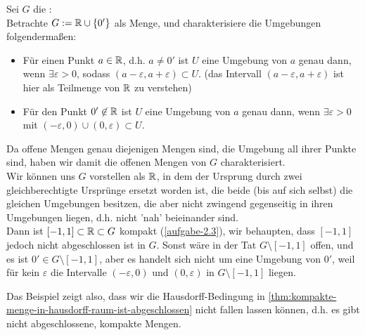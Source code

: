 \begin{example}
    Sei $G$ die : \\
    Betrachte $G:=\mathbb{R} \cup  \left \{0'\right\} $ als Menge, und charakterisiere die Umgebungen folgendermaßen:
    \begin{itemize}
        \item Für einen Punkt $a\in \mathbb{R}$, d.h. $a\neq 0'$ ist $U$ eine Umgebung von  $a$ genau dann, wenn  $\exists ε>0$, sodass $(a-ε,a+ε)\subset U$. (das Intervall $(a-ε,a+ε)$ ist hier als Teilmenge von  $\mathbb{R}$ zu verstehen)
        \item Für den Punkt $0'\not\in \mathbb{R}$ ist $U$ eine Umgebung von $a$ genau dann, wenn  $\exists ε>0$ mit $(-ε,0) \cup (0,ε)\subset U$.
    \end{itemize}
    Da offene Mengen genau diejenigen Mengen sind, die Umgebung all ihrer Punkte sind, haben wir damit die offenen Mengen von $G$ charakterisiert. \\
    Wir können uns $G$ vorstellen als  $\mathbb{R}$, in dem der Ursprung durch zwei gleichberechtigte Ursprünge ersetzt worden ist, die beide (bis auf sich selbst) die gleichen Umgebungen besitzen, die aber nicht zwingend gegenseitig in ihren Umgebungen liegen, d.h. nicht 'nah' beieinander sind. \\
    Dann ist $[-1,1]\subset \mathbb{R}\subset G$ kompakt (\autoref{aufgabe-2.3}), wir behaupten, dass $[-1,1]$ jedoch nicht abgeschlossen ist in  $G$. Sonst wäre in der Tat  $G \setminus [-1,1]$ offen, und es ist $0' \in G\setminus [-1,1]$, aber es handelt sich nicht um eine Umgebung von $0'$, weil für kein  $ε$ die Intervalle  $(-ε,0)$ und  $(0,ε)$ in  $G\setminus [-1,1]$ liegen. \\
\end{example}
\begin{remark*}
    Das Beispiel zeigt also, dass wir die Hausdorff-Bedingung in \autoref{thm:kompakte-menge-in-hausdorff-raum-ist-abgeschlossen} nicht fallen lassen können, d.h. es gibt nicht abgeschlossene, kompakte Mengen.
\end{remark*}

